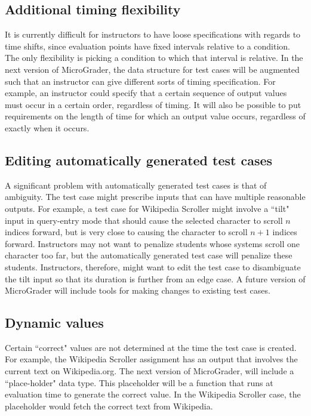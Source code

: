 \documentclass[12pt]{article}
\begin{document}
\subsection{Additional timing flexibility}
It is currently difficult for instructors to have loose specifications with regards to time shifts, since evaluation points have fixed intervals relative to a condition.  The only flexibility is picking a condition to which that interval is relative.  In the next version of MicroGrader, the data structure for test cases will be augmented such that an instructor can give different sorts of timing specification.  For example, an instructor could specify that a certain sequence of output values must occur in a certain order, regardless of timing.  It will also be possible to put requirements on the length of time for which an output value occurs, regardless of exactly when it occurs.

\subsection{Editing automatically generated test cases}
A significant problem with automatically generated test cases is that of ambiguity.  The test case might prescribe inputs that can have multiple reasonable outputs.  For example, a test case for Wikipedia Scroller might involve a ``tilt" input in query-entry mode that should cause the selected character to scroll $n$ indices forward, but is very close to causing the character to scroll $n+1$ indices forward.  Instructors may not want to penalize students whose systems scroll one character too far, but the automatically generated test case will penalize these students.  Instructors, therefore, might want to edit the test case to disambiguate the tilt input so that its duration is further from an edge case.  A future version of MicroGrader will include tools for making changes to existing test cases.

\subsection{Dynamic values}
Certain ``correct" values are not determined at the time the test case is created.  For example, the Wikipedia Scroller assignment has an output that involves the current text on Wikipedia.org.  The next version of MicroGrader, will include a ``place-holder" data type.  This placeholder will be a function that runs at evaluation time to generate the correct value.  In the Wikipedia Scroller case, the placeholder would fetch the correct text from Wikipedia.
\end{document}
